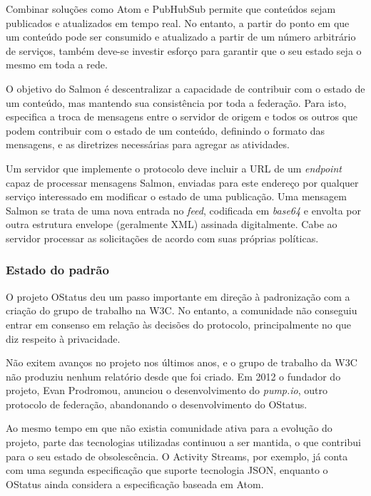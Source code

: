 Combinar soluções como Atom e PubHubSub permite que conteúdos sejam publicados e
atualizados em tempo real. No entanto, a partir do ponto em que um conteúdo pode ser
consumido e atualizado a partir de um número arbitrário de serviços, também deve-se
investir esforço para garantir que o seu estado seja o mesmo em toda a rede.

O objetivo do Salmon é descentralizar a capacidade de contribuir com o estado de um
conteúdo, mas mantendo sua consistência por toda a federação. Para isto,
especifica a troca de mensagens entre o servidor de origem e todos os outros que
podem contribuir com o estado de um conteúdo, definindo o formato das mensagens, e
as diretrizes necessárias para agregar as atividades.

Um servidor que implemente o protocolo deve incluir a URL de um \textit{endpoint}
capaz de processar mensagens Salmon, enviadas para este endereço por qualquer
serviço interessado em modificar o estado de uma publicação. Uma mensagem Salmon se
trata de uma nova entrada no \textit{feed}, codificada em \textit{base64} e envolta
por outra estrutura envelope (geralmente XML) assinada digitalmente. Cabe ao
servidor processar as solicitações de acordo com suas próprias políticas.

\subsubsection{Estado do padrão}

O projeto OStatus deu um passo importante em direção à padronização com a criação do
grupo de trabalho na W3C. No entanto, a comunidade não conseguiu entrar em consenso
em relação às decisões do protocolo, principalmente no que diz respeito à
privacidade.

Não exitem avanços no projeto nos últimos anos, e o grupo de trabalho da W3C não
produziu nenhum relatório desde que foi criado. Em 2012 o fundador do projeto, Evan
Prodromou, anunciou o desenvolvimento do \textit{pump.io}, outro protocolo de
federação, abandonando o desenvolvimento do OStatus.

Ao mesmo tempo em que não existia comunidade ativa para a evolução do projeto, parte
das tecnologias utilizadas continuou a ser mantida, o que contribui para o seu
estado de obsolescência. O Activity Streams, por exemplo, já conta com uma segunda
especificação que suporte tecnologia JSON, enquanto o OStatus ainda considera a
especificação baseada em Atom.



